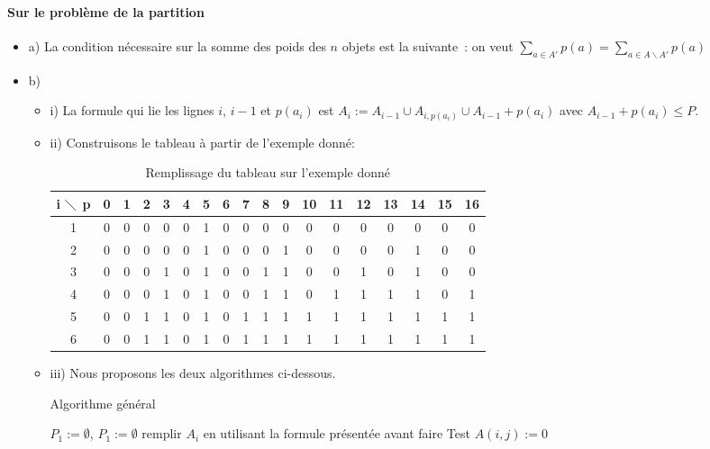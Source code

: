 \paragraph{Sur le problème de la partition}

\begin{itemize}
\item a) La condition nécessaire sur la somme des poids des $n$ objets
  est la suivante~: on veut $\sum_{a \in A'} p(a)= \sum_{a \in A
    \backslash A'}p(a)$
\item b) 
\begin{itemize}
\item i) La formule qui lie les lignes $i$, $i-1$ et $p(a_i)$ est $A_i
  := A_{i-1} \cup A_{i, p(a_i)} \cup A_{i-1}+p(a_i)$ avec
  $A_{i-1}+p(a_i) \leq P$.
\item ii) Construisons le tableau à partir de l'exemple donné:
\begin{table}[h!]
\centering
	\begin{tabular}{|c|c|c|c|c|c|c|c|c|c|c|c|c|c|c|c|c|c|}
    \hline
     i $\diagdown$ p & 0 & 1 & 2 & 3 & 4 & 5 & 6 & 7 & 8 & 9 & 10 & 11 & 12 & 13 & 14 & 15 & 16 \\
    \hline
   1 & 0 & 0 & 0 & 0 & 0 & 1 & 0 & 0 & 0 & 0 & 0 & 0 & 0 & 0 & 0 & 0 & 0 \\
     \hline
	2& 0 & 0 & 0 & 0 & 0 & 1 & 0 & 0 & 0 & 1 & 0 & 0 & 0 & 0 & 1 & 0 & 0 \\
   \hline
	3 & 0 & 0 & 0 & 1 & 0 & 1 & 0 & 0 & 1 & 1 & 0 & 0 & 1 & 0 & 1 & 0 & 0 \\
	\hline
	4 & 0 & 0 & 0 & 1 & 0 & 1 & 0 & 0 & 1 & 1 & 0 & 1 & 1 & 1 & 1 & 0 & 1 \\
	  \hline
	5 & 0 & 0 & 1 & 1 & 0 & 1 & 0 & 1 & 1 & 1 & 1 & 1 & 1 & 1 & 1 & 1 & 1 \\
	\hline
	6 & 0 & 0 & 1 & 1 & 0 & 1 & 0 & 1 & 1 & 1 & 1 & 1 & 1 & 1 & 1 & 1 & 1\\
	\hline
\end{tabular}
\caption {Remplissage du tableau sur l'exemple donné}
\end{table} 
\item iii) Nous proposons les deux algorithmes ci-dessous.
\begin{algorithm}[t]
\caption{Algorithme général}
\label{algoexo7}
\begin{algorithmic}[1]
\STATE $P_1 := \emptyset $,  $P_1 := \emptyset $
\STATE remplir $A_i$ en utilisant la formule présentée avant
\STATE faire Test
\STATE $A(i,j):=0$
\ENDIF
\ENDWHILE
\ENDFOR
\end{algorithmic}
\end{algorithm}


\end{itemize}
\end{itemize}
